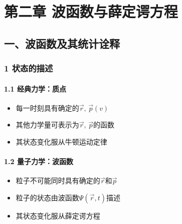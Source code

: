 \documentclass[UTF8,twocolumn]{ctexart}
\date{}
\providecommand{\tightlist}{%
  \setlength{\itemsep}{0pt}\setlength{\parskip}{0pt}}
\let\oldparagraph\paragraph
\renewcommand{\paragraph}[1]{\oldparagraph{#1}\mbox{}}
\begin{document}
\hypertarget{ux7b2cux4e8cux7ae0ux6ce2ux51fdux6570ux4e0eux859bux5b9aux8c14ux65b9ux7a0b}{%
\section{第二章{ }波函数与薛定谔方程}\label{ux7b2cux4e8cux7ae0ux6ce2ux51fdux6570ux4e0eux859bux5b9aux8c14ux65b9ux7a0b}}

\hypertarget{ux4e00ux6ce2ux51fdux6570ux53caux5176ux7edfux8ba1ux8be0ux91ca}{%
\subsection{一、波函数及其统计诠释}\label{ux4e00ux6ce2ux51fdux6570ux53caux5176ux7edfux8ba1ux8be0ux91ca}}

\hypertarget{ux72b6ux6001ux7684ux63cfux8ff0}{%
\subsubsection{1 状态的描述}\label{ux72b6ux6001ux7684ux63cfux8ff0}}

\hypertarget{ux7ecfux5178ux529bux5b66ux8d28ux70b9}{%
\paragraph{{ }1.1
经典力学：质点}\label{ux7ecfux5178ux529bux5b66ux8d28ux70b9}}

\begin{itemize}
\tightlist
\item
  每一时刻具有确定的\(\vec{r},\,\vec{p}(v)\)
\item
  其他力学量可表示为\(\vec{r},\,\vec{p}\)的函数
\item
  其状态变化服从牛顿运动定律
\end{itemize}

\hypertarget{ux91cfux5b50ux529bux5b66ux6ce2ux51fdux6570}{%
\paragraph{{ }1.2
量子力学：波函数}\label{ux91cfux5b50ux529bux5b66ux6ce2ux51fdux6570}}

\begin{itemize}
\tightlist
\item
  粒子不可能同时具有确定的\(\vec{r}\)和\(\vec{p}\)
\item
  粒子的状态由波函数\(\Psi(\vec{r},t)\)描述
\item
  其状态变化服从薛定谔方程
\end{itemize}
\end{document}
